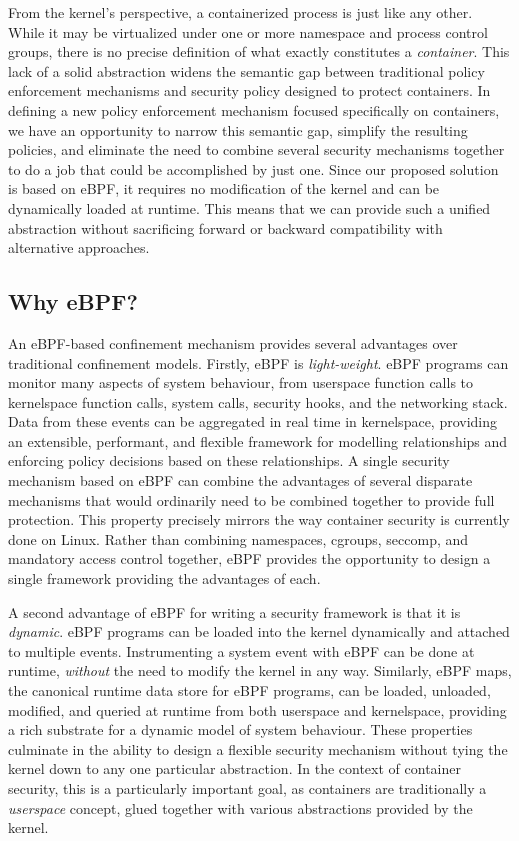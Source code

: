 From the kernel's perspective, a containerized process is just like any other. While it
may be virtualized under one or more namespace and process control groups, there is no
precise definition of what exactly constitutes a \textit{container}. This lack of a solid
abstraction widens the semantic gap between traditional policy enforcement mechanisms and
security policy designed to protect containers. In defining a new policy enforcement
mechanism focused specifically on containers, we have an opportunity to narrow this
semantic gap, simplify the resulting policies, and eliminate the need to combine several
security mechanisms together to do a job that could be accomplished by just one. Since our
proposed solution is based on eBPF, it requires no modification of the kernel and can be
dynamically loaded at runtime.  This means that we can provide such a unified abstraction
without sacrificing forward or backward compatibility with alternative approaches.

\subsection{Why eBPF?}%
\label{ss:why-ebpf}

An eBPF-based confinement mechanism provides several advantages over traditional
confinement models.  Firstly, eBPF is \textit{light-weight}. eBPF programs can monitor
many aspects of system behaviour, from userspace function calls to kernelspace function
calls, system calls, security hooks, and the networking stack. Data from these events can
be aggregated in real time in kernelspace, providing an extensible, performant, and
flexible framework for modelling relationships and enforcing policy decisions based on
these relationships.  A single security mechanism based on eBPF can combine the advantages
of several disparate mechanisms that would ordinarily need to be combined together to
provide full protection. This property precisely mirrors the way container security is
currently done on Linux. Rather than combining namespaces, cgroups, seccomp, and mandatory
access control together, eBPF provides the opportunity to design a single framework
providing the advantages of each.

A second advantage of eBPF for writing a security framework is that it is
\textit{dynamic}. eBPF programs can be loaded into the kernel dynamically and attached to
multiple events. Instrumenting a system event with eBPF can be done at runtime,
\textit{without} the need to modify the kernel in any way.  Similarly, eBPF maps, the
canonical runtime data store for eBPF programs, can be loaded, unloaded, modified, and
queried at runtime from both userspace and kernelspace, providing a rich substrate for
a dynamic model of system behaviour. These properties culminate in the ability to design
a flexible security mechanism without tying the kernel down to any one particular
abstraction. In the context of container security, this is a particularly important goal,
as containers are traditionally a \textit{userspace} concept, glued together with various
abstractions provided by the kernel.

